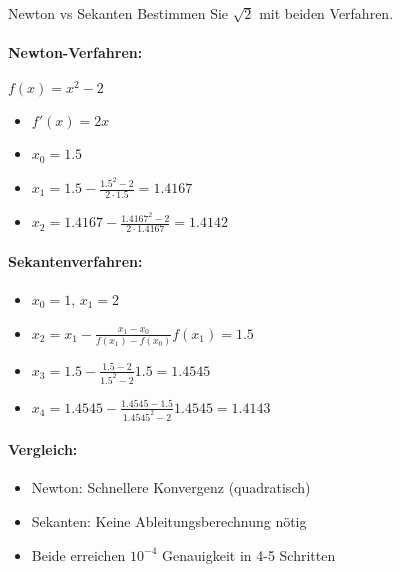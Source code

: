 \begin{example2}{Newton vs Sekanten}
Bestimmen Sie $\sqrt{2}$ mit beiden Verfahren.

\paragraph{Newton-Verfahren:} $f(x) = x^2-2$
\begin{itemize}
    \item $f'(x) = 2x$
    \item $x_0 = 1.5$
    \item $x_1 = 1.5 - \frac{1.5^2-2}{2\cdot1.5} = 1.4167$
    \item $x_2 = 1.4167 - \frac{1.4167^2-2}{2\cdot1.4167} = 1.4142$
\end{itemize}

\paragraph{Sekantenverfahren:}
\begin{itemize}
    \item $x_0 = 1$, $x_1 = 2$
    \item $x_2 = x_1 - \frac{x_1-x_0}{f(x_1)-f(x_0)}f(x_1) = 1.5$
    \item $x_3 = 1.5 - \frac{1.5-2}{1.5^2-2}1.5 = 1.4545$
    \item $x_4 = 1.4545 - \frac{1.4545-1.5}{1.4545^2-2}1.4545 = 1.4143$
\end{itemize}

\paragraph{Vergleich:}
\begin{itemize}
    \item Newton: Schnellere Konvergenz (quadratisch)
    \item Sekanten: Keine Ableitungsberechnung nötig
    \item Beide erreichen $10^{-4}$ Genauigkeit in 4-5 Schritten
\end{itemize}
\end{example2}

